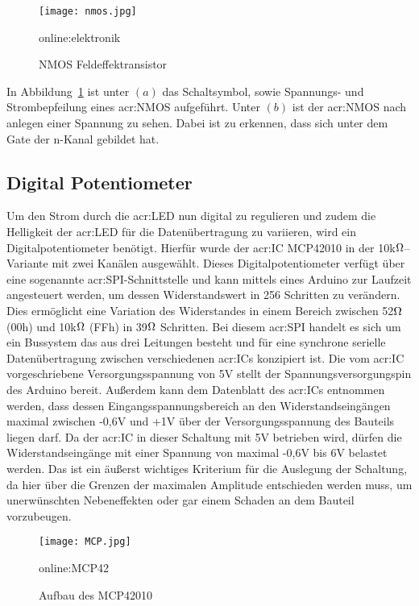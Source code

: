 \begin{figure}[H]
	\centering
	\texttt{[image: nmos.jpg]}
	\caption[NMOS Feldeffektransistor]{NMOS Feldeffektransistor} 
	\gls{online:elektronik}
	\label{fig:nmos}
\end{figure}


In Abbildung~\ref{fig:nmos} ist unter $(a)$ das Schaltsymbol, sowie Spannungs- und Strombepfeilung eines \gls{acr:NMOS} aufgeführt. Unter $(b)$ ist der \gls{acr:NMOS} nach anlegen einer Spannung zu sehen. Dabei ist zu erkennen, dass sich unter dem Gate der n-Kanal gebildet hat. 
\subsection{Digital Potentiometer}
\label{subsec:digipot}

Um den Strom durch die \gls{acr:LED} nun digital zu regulieren und zudem die Helligkeit der \gls{acr:LED} für die Datenübertragung zu variieren, wird ein Digitalpotentiometer benötigt. Hierfür wurde der \gls{acr:IC} MCP42010 in der 10k$\ohm$–Variante mit zwei Kanälen ausgewählt. Dieses Digitalpotentiometer verfügt über eine sogenannte \gls{acr:SPI}-Schnittstelle und kann mittels eines Arduino zur Laufzeit angesteuert werden, um dessen Widerstandswert in 256 Schritten zu verändern. Dies ermöglicht eine Variation des Widerstandes in einem Bereich zwischen 52$\ohm$ (00h) und 10k$\ohm$ (FFh) in 39$\ohm$ Schritten. Bei diesem \gls{acr:SPI} handelt es sich um ein Bussystem das aus drei Leitungen besteht und für eine synchrone serielle Datenübertragung zwischen verschiedenen \gls{acr:IC}s konzipiert ist. Die vom \gls{acr:IC} vorgeschriebene Versorgungsspannung von 5V stellt der Spannungsversorgungspin des Arduino bereit. Außerdem kann dem Datenblatt des \gls{acr:IC}s entnommen werden, dass dessen Eingangsspannungsbereich an den Widerstandseingängen maximal zwischen -0,6V und +1V über der Versorgungsspannung des Bauteils liegen darf. Da der \gls{acr:IC} in dieser Schaltung mit 5V betrieben wird, dürfen die Widerstandseingänge mit einer Spannung von maximal -0,6V bis 6V belastet werden. Das ist ein äußerst wichtiges Kriterium für die Auslegung der Schaltung, da hier über die Grenzen der maximalen Amplitude entschieden werden muss, um unerwünschten Nebeneffekten oder gar einem Schaden an dem Bauteil vorzubeugen.

\begin{figure}[H]
	\centering
	\texttt{[image: MCP.jpg]}
	\caption[Aufbau des MCP42010]{Aufbau des MCP42010} 
	\gls{online:MCP42}
	\label{fig:MCP}
\end{figure}

